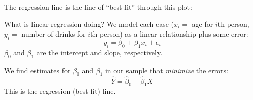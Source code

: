 \documentclass{beamer}
\begin{document}
\begin{darkframes}
\begin{frame}[fragile]
\begin{knitrout}
\begin{kframe}
{\ttfamily\noindent\bfseries\color{errorcolor}{Error in jitter(num.drinks, 4): object 'num.drinks' not found}}\end{kframe}
\end{knitrout}
    \end{frame}

    \begin{frame}[fragile]
      The regression line is the line of ``best fit'' through this plot:
\begin{knitrout}
\begin{kframe}


{\ttfamily\noindent\bfseries\color{errorcolor}{Error in eval(predvars, data, env): object 'num.drinks' not found}}

{\ttfamily\noindent\bfseries\color{errorcolor}{Error in eval(predvars, data, env): object 'num.drinks' not found}}

{\ttfamily\noindent\bfseries{}}\end{kframe}
\end{knitrout}
      \lc
    \end{frame}

    \begin{frame}{What is linear regression doing?}
      We model each case ($x_i=$ age for $i$th person, $y_i=$ number of drinks for $i$th person) as a linear relationship plus some error:
      \[
        y_i = \beta_0 + \beta_1 x_i + \epsilon_i
      \]
      $\beta_0$ and $\beta_1$ are the intercept and slope, respectively.
      \bigskip\pause

      We find estimates for $\beta_0$ and $\beta_1$ in our sample that \emph{minimize} the errors:
      \[
        \hat Y = \hat\beta_0 + \hat\beta_1 X
      \]
      This is the regression (best fit) line.
    \end{frame}

    \begin{frame}[fragile]
      \fontsize{9}{9}\selectfont
\begin{knitrout}
\begin{kframe}
\begin{alltt}
\hlstd{> } \hlkwb{<-}  \hlopt{~} 
\end{alltt}


{\ttfamily\noindent\bfseries\color{errorcolor}{Error in eval(predvars, data, env): object 'num.drinks' not found}}\begin{alltt}
\hlstd{> }
\end{alltt}



\end{kframe}
\end{knitrout}
\end{frame}
\end{darkframes}
\end{document}
